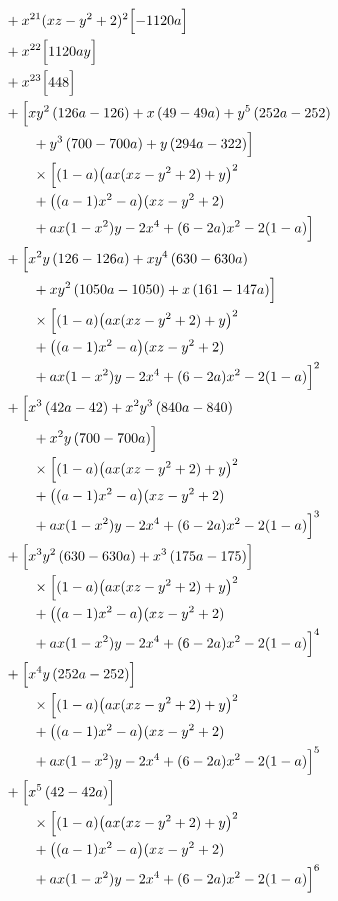 \begin{align*}
&{}+x^{21}(xz-y^2+2)^{2}\Bigl[- 1120 a\Bigr]\\
&{}+x^{22}\Bigl[1120 a y\Bigr]\\
&{}+x^{23}\Bigl[448\Bigr]\\
&{}+\Bigl[x y^{2} \left(126 a - 126\right) + x \left(49 - 49 a\right) + y^{5} \left(252 a - 252\right)\\
&\qquad + y^{3} \left(700 - 700 a\right) + y \left(294 a - 322\right)\Bigr]\\
&\qquad {}\times\Bigl[(1-a)\bigl(ax(xz-y^2+2)+y\bigr)^2\\
&\qquad +\bigl((a-1)x^2-a\bigr)(xz-y^2+2)\\
&\qquad +ax(1-x^2)y-2x^4+(6-2a)x^2-2(1-a)\Bigr]\\
&{}+\Bigl[x^{2} y \left(126 - 126 a\right) + x y^{4} \left(630 - 630 a\right)\\
&\qquad + x y^{2} \left(1050 a - 1050\right) + x \left(161 - 147 a\right)\Bigr]\\
&\qquad {}\times\Bigl[(1-a)\bigl(ax(xz-y^2+2)+y\bigr)^2\\
&\qquad +\bigl((a-1)x^2-a\bigr)(xz-y^2+2)\\
&\qquad +ax(1-x^2)y-2x^4+(6-2a)x^2-2(1-a)\Bigr]^{2}\\
&{}+\Bigl[x^{3} \left(42 a - 42\right) + x^{2} y^{3} \left(840 a - 840\right)\\
&\qquad + x^{2} y \left(700 - 700 a\right)\Bigr]\\
&\qquad {}\times\Bigl[(1-a)\bigl(ax(xz-y^2+2)+y\bigr)^2\\
&\qquad +\bigl((a-1)x^2-a\bigr)(xz-y^2+2)\\
&\qquad +ax(1-x^2)y-2x^4+(6-2a)x^2-2(1-a)\Bigr]^{3}\\
&{}+\Bigl[x^{3} y^{2} \left(630 - 630 a\right) + x^{3} \left(175 a - 175\right)\Bigr]\\
&\qquad {}\times\Bigl[(1-a)\bigl(ax(xz-y^2+2)+y\bigr)^2\\
&\qquad +\bigl((a-1)x^2-a\bigr)(xz-y^2+2)\\
&\qquad +ax(1-x^2)y-2x^4+(6-2a)x^2-2(1-a)\Bigr]^{4}\\
&{}+\Bigl[x^{4} y \left(252 a - 252\right)\Bigr]\\
&\qquad {}\times\Bigl[(1-a)\bigl(ax(xz-y^2+2)+y\bigr)^2\\
&\qquad +\bigl((a-1)x^2-a\bigr)(xz-y^2+2)\\
&\qquad +ax(1-x^2)y-2x^4+(6-2a)x^2-2(1-a)\Bigr]^{5}\\
&{}+\Bigl[x^{5} \left(42 - 42 a\right)\Bigr]\\
&\qquad {}\times\Bigl[(1-a)\bigl(ax(xz-y^2+2)+y\bigr)^2\\
&\qquad +\bigl((a-1)x^2-a\bigr)(xz-y^2+2)\\
&\qquad +ax(1-x^2)y-2x^4+(6-2a)x^2-2(1-a)\Bigr]^{6}
\end{align*}


